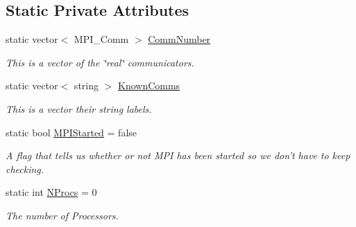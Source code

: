 \subsection*{Static Private Attributes}
\begin{DoxyCompactItemize}
\item 
static vector$<$ MPI\_\-Comm $>$ \hyperlink{classJKBuilder_1_1MPIManager_af2e854b00a926ebf1d7c5ecf42b39730}{CommNumber}
\begin{DoxyCompactList}\small\item\em This is a vector of the \char`\"{}real\char`\"{} communicators. \item\end{DoxyCompactList}\item 
static vector$<$ string $>$ \hyperlink{classJKBuilder_1_1MPIManager_a5c4dab3dd2e63bd6c3095b187a108a79}{KnownComms}
\begin{DoxyCompactList}\small\item\em This is a vector their string labels. \item\end{DoxyCompactList}\item 
static bool \hyperlink{classJKBuilder_1_1MPIManager_a69d6fedda1d1b6c334d4b158a25c7d6c}{MPIStarted} = false
\begin{DoxyCompactList}\small\item\em A flag that tells us whether or not MPI has been started so we don't have to keep checking. \item\end{DoxyCompactList}\item 
static int \hyperlink{classJKBuilder_1_1MPIManager_adcb0533b7c1700c2da6b4a0b64c9c947}{NProcs} = 0
\begin{DoxyCompactList}\small\item\em The number of Processors. \item\end{DoxyCompactList}\end{DoxyCompactItemize}


